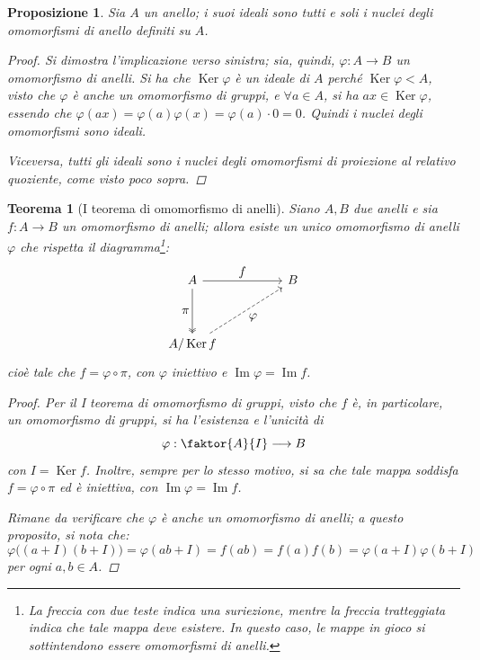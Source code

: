 \documentclass[12pt]{scrartcl}
\theoremstyle{style}
\newtheorem{prop}{Proposizione}[section]
\newtheorem{teorema}{Teorema}[section]
\numberwithin{equation}{subsection}
\begin{document}
\begin{prop}
	Sia $A$ un anello; i suoi ideali sono tutti e soli i nuclei degli omomorfismi di anello definiti su $A$.
	\begin{proof}
		Si dimostra l'implicazione verso sinistra; sia, quindi, $\varphi  : A \to B$ un omomorfismo di anelli.
		Si ha che $\operatorname{Ker} \varphi $ \`e un ideale di $A$ perch\'e $\operatorname{Ker} \varphi <  A$, visto che $\varphi $ \`e anche un omomorfismo di gruppi, e $\forall a \in A$, si ha $ax \in \operatorname{Ker} \varphi $, essendo che $\varphi (ax) = \varphi (a) \varphi (x) = \varphi (a) \cdot 0 = 0$.
		Quindi i nuclei degli omomorfismi sono ideali.

		Viceversa, tutti gli ideali sono i nuclei degli omomorfismi di proiezione al relativo quoziente, come visto poco sopra.
	\end{proof}
\end{prop}
\begin{teorema}
	[I teorema di omomorfismo di anelli]
	Siano $A,B$ due anelli e sia $f: A \to B$ un omomorfismo di anelli; allora esiste un unico omomorfismo di anelli $\varphi $ che rispetta il diagramma\footnote{La freccia con due teste indica una suriezione, mentre la freccia tratteggiata indica che tale mappa deve esistere. In questo caso, le mappe in gioco si sottintendono essere omomorfismi di anelli.}:
\[
\begin{tikzcd}
	A & & B\\
	\\
	A / \operatorname{Ker} f
	\arrow[from=1-1,to=1-3,"\displaystyle f"]
	\arrow[from=1-1,to=3-1,"\displaystyle \pi"',two heads]
	\arrow[from=3-1,to=1-3,"\displaystyle \varphi "',dashed]
\end{tikzcd}
\] 
	cio\`e tale che $f = \varphi \circ \pi$, con $\varphi $ iniettivo e $\operatorname{Im} \varphi  = \operatorname{Im} f$.
	\begin{proof}
		Per il I teorema di omomorfismo di gruppi, visto che $f$ \`e, in particolare, un omomorfismo di gruppi, si ha l'esistenza e l'unicit\`a di 
		\[
		\varphi  : \faktor{A}{I} \longrightarrow B
		\] 
		con $I = \operatorname{Ker} f$.
		Inoltre, sempre per lo stesso motivo, si sa che tale mappa soddisfa $f = \varphi  \circ \pi$ ed \`e iniettiva, con $\operatorname{Im} \varphi = \operatorname{Im} f$.
		
		Rimane da verificare che $\varphi $ \`e anche un omomorfismo di anelli; a questo proposito, si nota che:
		\[
			\varphi \big((a+I)(b+I)\big)=\varphi (ab + I) = f(ab) =f(a)f(b) = \varphi (a+I) \varphi (b+I)
		\] 
		per ogni $a,b \in A$.
	\end{proof}
\end{teorema}
\end{document}

